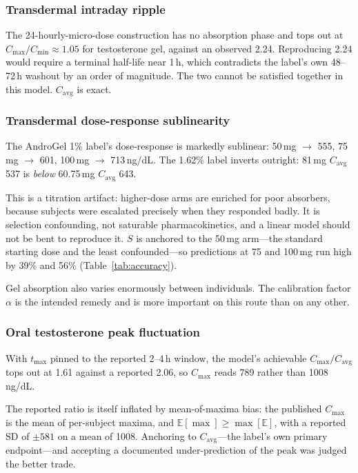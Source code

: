 \documentclass[11pt,a4paper]{article}
\begin{document}
\subsubsection{Transdermal intraday ripple}
\label{sec:td_ripple}

The 24-hourly-micro-dose construction has no absorption phase and tops
out at $C_{\max}/C_{\min} \approx 1.05$ for testosterone gel, against an
observed 2.24. Reproducing 2.24 would require a terminal half-life near
1\,h, which contradicts the label's own 48--72\,h washout by an order of
magnitude. The two cannot be satisfied together in this model.
$C_{\mathrm{avg}}$ is exact.

\subsubsection{Transdermal dose-response sublinearity}
\label{sec:td_dose_response}

The AndroGel 1\% label's dose-response is markedly sublinear:
50\,mg $\to$ 555, 75\,mg $\to$ 601, 100\,mg $\to$ 713\,ng/dL. The 1.62\%
label inverts outright: 81\,mg $C_{\mathrm{avg}}$ 537 is \emph{below}
60.75\,mg $C_{\mathrm{avg}}$ 643.

This is a titration artifact: higher-dose arms are enriched for poor
absorbers, because subjects were escalated precisely when they responded
badly. It is selection confounding, not saturable pharmacokinetics, and
a linear model should not be bent to reproduce it. $S$ is anchored to
the 50\,mg arm---the standard starting dose and the least
confounded---so predictions at 75 and 100\,mg run high by 39\% and 56\%
(Table~\ref{tab:accuracy}).

Gel absorption also varies enormously between individuals. The
calibration factor $\alpha$ is the intended remedy and is more important
on this route than on any other.

\subsubsection{Oral testosterone peak fluctuation}
\label{sec:oral_t_limitation}

With $t_{\max}$ pinned to the reported 2--4\,h window, the model's
achievable $C_{\max}/C_{\mathrm{avg}}$ tops out at 1.61 against a
reported 2.06, so $C_{\max}$ reads 789 rather than 1008\,ng/dL.

The reported ratio is itself inflated by mean-of-maxima bias: the
published $C_{\max}$ is the mean of per-subject maxima, and
$\mathbb{E}[\max] \ge \max[\mathbb{E}]$, with a reported SD of $\pm 581$
on a mean of 1008. Anchoring to $C_{\mathrm{avg}}$---the label's own
primary endpoint---and accepting a documented under-prediction of the
peak was judged the better trade.
\end{document}
